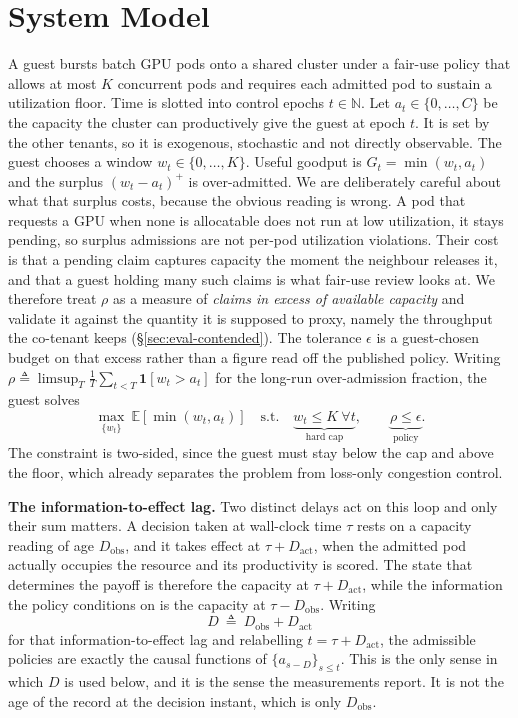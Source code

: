 \section{System Model}
\label{sec:model}

A guest bursts batch GPU pods onto a shared cluster under a fair-use policy that
allows at most $K$ concurrent pods and requires each admitted pod to sustain a
utilization floor. Time is slotted into control epochs $t\in\mathbb{N}$. Let
$a_t\in\{0,\dots,C\}$ be the capacity the cluster can productively give the guest
at epoch $t$. It is set by the other tenants, so it is exogenous, stochastic and
not directly observable. The guest chooses a window $w_t\in\{0,\dots,K\}$. Useful
goodput is $G_t=\min(w_t,a_t)$ and the surplus $(w_t-a_t)^{+}$ is over-admitted.
We are deliberately careful about what that surplus costs, because the obvious
reading is wrong. A pod that requests a GPU when none is allocatable does not run
at low utilization, it stays pending, so surplus admissions are not per-pod
utilization violations. Their cost is that a pending claim captures capacity the
moment the neighbour releases it, and that a guest holding many such claims is
what fair-use review looks at. We therefore treat $\rho$ as a measure of
\emph{claims in excess of available capacity} and validate it against the quantity
it is supposed to proxy, namely the throughput the co-tenant keeps
(\S\ref{sec:eval-contended}). The tolerance $\epsilon$ is a guest-chosen budget on
that excess rather than a figure read off the published policy.
Writing $\rho\triangleq\limsup_T\frac1T\sum_{t<T}\mathbf 1[w_t>a_t]$ for the
long-run over-admission fraction, the guest solves
\begin{equation}\label{eq:polite}
\max_{\{w_t\}}\ \mathbb{E}[\min(w_t,a_t)]
\quad\text{s.t.}\quad
\underbrace{w_t\le K\ \forall t}_{\text{hard cap}},\qquad
\underbrace{\rho\le\epsilon}_{\text{policy}} .
\end{equation}
The constraint is two-sided, since the guest must stay below the cap and above the
floor, which already separates the problem from loss-only congestion control.

\noindent\textbf{The information-to-effect lag.}
Two distinct delays act on this loop and only their sum matters. A decision taken
at wall-clock time $\tau$ rests on a capacity reading of age
$D_{\mathrm{obs}}$, and it takes effect at $\tau+D_{\mathrm{act}}$, when the
admitted pod actually occupies the resource and its productivity is scored. The
state that determines the payoff is therefore the capacity at
$\tau+D_{\mathrm{act}}$, while the information the policy conditions on is the
capacity at $\tau-D_{\mathrm{obs}}$. Writing
\begin{equation}\label{eq:Ddef}
D\ \triangleq\ D_{\mathrm{obs}}+D_{\mathrm{act}}
\end{equation}
for that information-to-effect lag and relabelling $t=\tau+D_{\mathrm{act}}$, the
admissible policies are exactly the causal functions of $\{a_{s-D}\}_{s\le t}$.
This is the only sense in which $D$ is used below, and it is the sense the measurements
report. It is not the age of the record at the decision instant, which is only
$D_{\mathrm{obs}}$.


